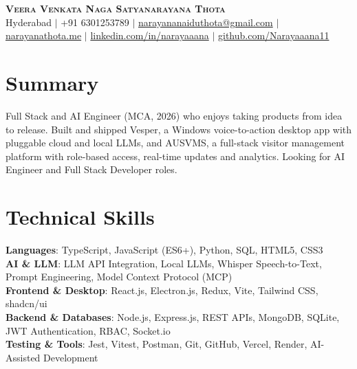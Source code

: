\documentclass[letterpaper,10pt]{article}
\begin{document}
\begin{center}
\textbf{\Huge \scshape Veera Venkata Naga Satyanarayana Thota} \\ \vspace{1pt}
\footnotesize Hyderabad $|$ +91 6301253789 $|$
\href{mailto:narayananaiduthota@gmail.com}{narayananaiduthota@gmail.com} $|$
\href{https://www.narayanathota.me}{narayanathota.me} $|$
\href{https://www.linkedin.com/in/narayaaana/}{linkedin.com/in/narayaaana} $|$
\href{https://github.com/Narayaaana11}{github.com/Narayaaana11}\\ \vspace{2pt}
\end{center}

\section{Summary}
\small{Full Stack and AI Engineer (MCA, 2026) who enjoys taking products from idea to release. Built and shipped Vesper, a Windows voice-to-action desktop app with pluggable cloud and local LLMs, and AUSVMS, a full-stack visitor management platform with role-based access, real-time updates and analytics. Looking for AI Engineer and Full Stack Developer roles.}

\section{Technical Skills}
\begin{itemize}[leftmargin=0.15in, label={}]
\small{\item{
\textbf{Languages}{: TypeScript, JavaScript (ES6+), Python, SQL, HTML5, CSS3} \\
\textbf{AI \& LLM}{: LLM API Integration, Local LLMs, Whisper Speech-to-Text, Prompt Engineering, Model Context Protocol (MCP)} \\
\textbf{Frontend \& Desktop}{: React.js, Electron.js, Redux, Vite, Tailwind CSS, shadcn/ui} \\
\textbf{Backend \& Databases}{: Node.js, Express.js, REST APIs, MongoDB, SQLite, JWT Authentication, RBAC, Socket.io} \\
\textbf{Testing \& Tools}{: Jest, Vitest, Postman, Git, GitHub, Vercel, Render, AI-Assisted Development} \\
}}
\end{itemize}

\end{document}
